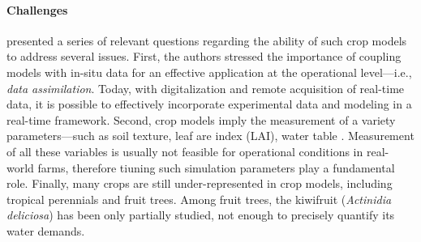 \paragraph{Challenges} \cite{silva-giller-2020} presented a series of relevant questions regarding the ability of such crop models to address several issues.
First, the authors stressed the importance of coupling models with in-situ data for an effective application at the operational level---i.e., \textit{data assimilation}.
Today, with digitalization and remote acquisition of real-time data, it is possible to effectively incorporate experimental data and modeling in a real-time framework.
Second, crop models imply the measurement of a variety parameters---such as soil texture, leaf are index (LAI), water table  \cite{marshall-etal-1996}.
Measurement of all these variables is usually not feasible for operational conditions in real-world farms, therefore tiuning such simulation parameters play a fundamental role.
Finally, many crops are still under-represented in crop models, including tropical perennials and fruit trees.
Among fruit trees, the kiwifruit (\emph{Actinidia deliciosa}) has been only partially studied, not enough to precisely quantify its water demands.


